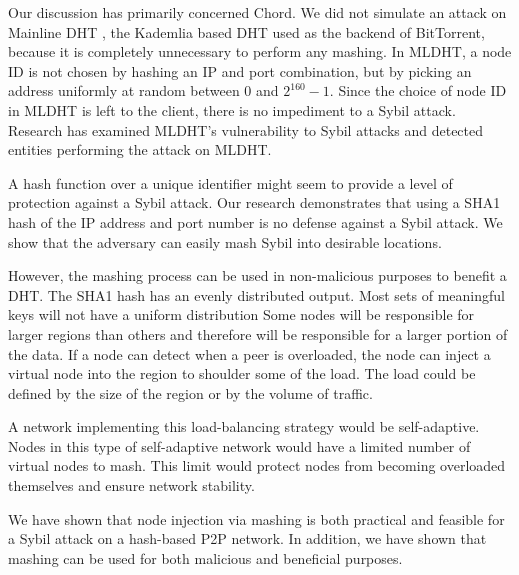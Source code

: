 Our discussion has primarily concerned Chord.
We did not simulate an attack on Mainline DHT  \cite{mainline}, the Kademlia \cite{kademlia} based DHT used as the backend of BitTorrent, because it is completely unnecessary to perform any mashing.
In MLDHT, a node ID is not chosen by hashing an IP and port combination, but by picking an address uniformly at random between 0 and $2^{160}-1$.
Since the choice of node ID in MLDHT is left to the client, there is no impediment to a Sybil attack. 
Research has examined MLDHT's vulnerability to Sybil attacks \cite{sybilbit} and detected entities performing the attack on MLDHT.

A hash function over a unique identifier might seem to provide a level of protection against a Sybil attack.
Our research demonstrates that using a SHA1 hash of the IP address and port number is no defense against a Sybil attack. 
We show that the adversary can easily mash Sybil into desirable locations.


However, the mashing process can be used in non-malicious purposes to benefit a DHT.
The SHA1 hash has an evenly distributed output. 
Most sets of meaningful keys will not have a uniform distribution \cite{shannon2001mathematical}
Some nodes will be responsible for larger regions than others and therefore will be responsible for a larger portion of the data.
If a node can detect when a peer is overloaded, the node can inject a virtual node into the region to shoulder some of the load.
The load could be defined by the size of the region or by the volume of traffic.

A network implementing this load-balancing strategy would be self-adaptive.
Nodes in this type of self-adaptive network would have a limited number of virtual nodes to mash.
This limit would protect nodes from becoming overloaded themselves and ensure network stability.

We have shown that node injection via mashing is both practical and feasible for a Sybil attack on a hash-based P2P network.
In addition, we have shown that mashing can be used for both malicious and beneficial purposes.